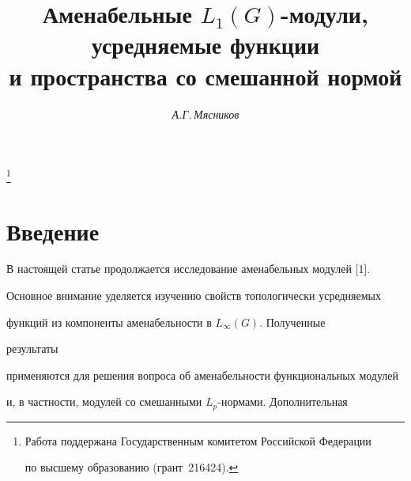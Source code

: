 



\author{\it А.Г.\,Мясников}




\title{Аменабельные $L_1(G)$-модули, усредняемые функции\\


и пространства со смешанной нормой}





\thanks{Работа поддержана Государственным комитетом Российской Федерации


по высшему образованию (грант \No\,216424).}


\date{}







\pagestyle{plain} %













\maketitle





\section{Введение}





В настоящей статье продолжается исследование аменабельных модулей [1].


Основное внимание уделяется изучению свойств топологически усредняемых


функций из компоненты аменабельности в $L_\infty(G)$. Полученные


результаты


применяются для решения вопроса об аменабельности функциональных модулей


и, в частности, модулей со смешанными $L_p$-нормами. Дополнительная


